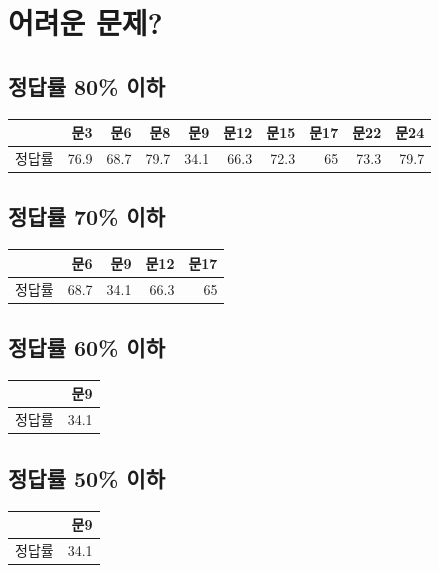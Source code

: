 \documentclass[
]{book}
\begin{document}
\section{어려운 문제?}\label{uxc5b4uxb824uxc6b4-uxbb38uxc81c}

\subsection{정답률 80\% 이하}\label{uxc815uxb2f5uxb960-80-uxc774uxd558}

\begin{tabular}{l|r|r|r|r|r|r|r|r|r}
\hline
  & 문3 & 문6 & 문8 & 문9 & 문12 & 문15 & 문17 & 문22 & 문24\\
\hline
정답률 & 76.9 & 68.7 & 79.7 & 34.1 & 66.3 & 72.3 & 65 & 73.3 & 79.7\\
\hline
\end{tabular}

\subsection{정답률 70\% 이하}\label{uxc815uxb2f5uxb960-70-uxc774uxd558}

\begin{tabular}{l|r|r|r|r}
\hline
  & 문6 & 문9 & 문12 & 문17\\
\hline
정답률 & 68.7 & 34.1 & 66.3 & 65\\
\hline
\end{tabular}

\subsection{정답률 60\% 이하}\label{uxc815uxb2f5uxb960-60-uxc774uxd558}

\begin{tabular}{l|r}
\hline
  & 문9\\
\hline
정답률 & 34.1\\
\hline
\end{tabular}

\subsection{정답률 50\% 이하}\label{uxc815uxb2f5uxb960-50-uxc774uxd558}

\begin{tabular}{l|r}
\hline
  & 문9\\
\hline
정답률 & 34.1\\
\hline
\end{tabular}
\end{document}
